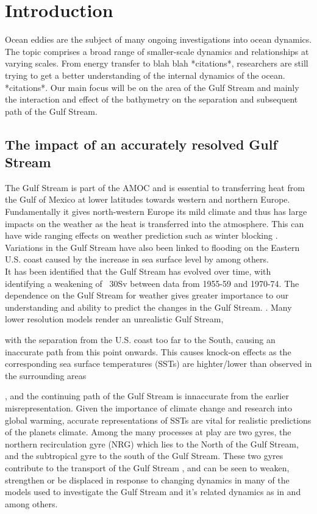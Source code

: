 \documentclass[..\EOYR.tex]{subfiles}
\begin{document}
\section{Introduction} \label{Introduction}

Ocean eddies are the subject of many ongoing investigations into ocean dynamics. The topic comprises a broad range of smaller-scale dynamics and relationships at varying scales. From energy transfer to blah blah *citations*, researchers are still trying to get a better understanding of the internal dynamics of the ocean. *citations*. Our main focus will be on the area of the Gulf Stream and mainly the interaction and effect of the bathymetry on the separation and subsequent path of the Gulf Stream.

\subsection{The impact of an accurately resolved Gulf Stream}
The Gulf Stream is part of the AMOC and is essential to transferring heat from the Gulf of Mexico at lower latitudes towards western and northern Europe.
Fundamentally it gives north-western Europe its mild climate and thus has large impacts on the weather as the heat is transferred into the atmosphere.
This can have wide ranging effects on weather prediction such as winter blocking \citep{Scaife2011a}.
Variations in the Gulf Stream have also been linked to flooding on the Eastern U.S. coast caused by the increase in sea surface level by \citep{Ezer2015} among others. \\
It has been identified that the Gulf Stream has evolved over time, with \citep{Greatbatch1991} identifying a weakening of ~30Sv between data from 1955-59 and 1970-74.  The dependence on the Gulf Stream for weather gives greater importance to our understanding and ability to predict the changes in the Gulf Stream. .
Many lower resolution models render an unrealistic Gulf Stream, with the separation from the U.S. coast too far to the South, causing an inaccurate path from this point onwards.
This causes knock-on effects as the corresponding sea surface temperatures (SSTs) are highter/lower than observed in the surrounding areas \citep{Greatbatch2004}, and the continuing path of the Gulf Stream is innaccurate from the earlier misrepresentation.
Given the importance of climate change and research into global warming, accurate representations of SSTs are vital for realistic predictions of the planets climate.
Among the many processes at play are two gyres, the  northern recirculation gyre (NRG) which lies to the North of the Gulf Stream, and the subtropical gyre to the south of the Gulf Stream. These two gyres contribute to the transport of the Gulf Stream \citep{Hogg1986}, and can be seen to weaken, strengthen or be displaced in response to changing dynamics in many of the models used to investigate the Gulf Stream and it's related dynamics as in  \citep{Greatbatch1991} and \citep{Zhang2007} among others.
\end{document}
